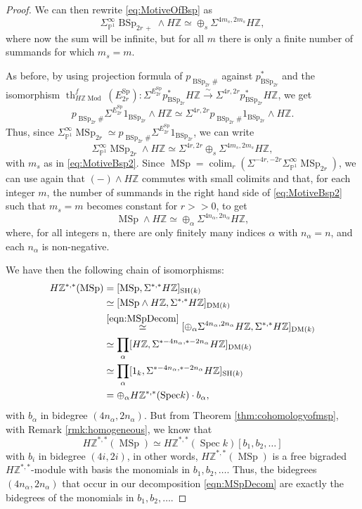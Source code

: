\documentclass[10pt]{amsart}
\theoremstyle{definition}
\theoremstyle{plain}
\numberwithin{equation}{section}
\newcommand{\0}{\emptyset}
\renewcommand{\P}{{\mathbb P}}
\newcommand{\Z}{{\mathbb Z}}
\newcommand{\MSp}{{\operatorname{MSp}}}
\newcommand{\BSp}{{\operatorname{BSp}}}
\newcommand{\Sp}{{\operatorname{Sp}}}
\newcommand{\Spec}{{\operatorname{Spec}}}
\newcommand{\SH}{{\operatorname{SH}}}
\newcommand{\DM}{{\operatorname{DM}}}
\renewcommand{\th}{{\operatorname{th}}}
\newcommand{\Mod}{{\operatorname{Mod}}}
\newcommand{\colim}{{\operatorname*{colim}}}
\begin{document}
\begin{proof}
    We can then rewrite \eqref{eq:MotiveOfBsp} as
    \begin{equation}
    \label{eq:MotiveBsp2}
        \Sigma_{\P^1}^\infty \BSp_{2r \, +}\wedge H\Z \simeq \oplus_s \Sigma^{4m_s,2m_s}H\Z,
    \end{equation}
    where now the sum will be infinite, but for all $m$ there is only a finite number of summands for which $m_s=m$.

    As before, by using projection formula of $p_{\BSp_{2r}\#}$ against $p_{\BSp_{2r}}^*$ and the isomorphism $\th^f_{H\Z \Mod}(E_{2r}^\Sp):\Sigma^{E_{2r}^\Sp}p_{\BSp_{2r}}^*H\Z \xrightarrow{\sim}\Sigma^{4r,2r}p_{\BSp_{2r}}^*H\Z$, we get
    $$p_{\BSp_{2r}\#}\Sigma^{E_{2r}^\Sp}1_{\BSp_{2r}}\wedge H\Z \simeq \Sigma^{4r,2r}p_{\BSp_{2r}\#}1_{\BSp_{2r}}\wedge H\Z.$$
    Thus, since $\Sigma_{\P^1}^\infty \MSp_{2r}\simeq p_{\BSp_{2r}\#}\Sigma^{E_{2r}^\Sp}1_{\BSp_{2r}}$, we can write
    $$\Sigma_{\P^1}^\infty \MSp_{2r} \wedge H\Z \simeq \Sigma^{4r,2r}\oplus_s \Sigma^{4m_s,2m_s}H\Z,$$
    with $m_s$ as in \eqref{eq:MotiveBsp2}. Since $\MSp =\colim_r(\Sigma^{-4r,-2r}\Sigma^\infty_{\P^1}\MSp_{2r})$, we can use again that $(-)\wedge H\Z$ commutes with small colimits and that, for each integer $m$, the number of summands in the right hand side of \eqref{eq:MotiveBsp2} such that $m_s=m$ becomes constant for $r>>0$, to get
    \begin{equation}\label{eqn:MSpDecom}
  \MSp \wedge H\Z \simeq \oplus_\alpha \Sigma^{4n_\alpha,2n_\alpha}H\Z,
  \end{equation}
    where, for all integers n, there are only finitely many indices $\alpha$ with $n_\alpha=n$, and each $n_\alpha$ is non-negative.

    We have then the following chain of isomorphisms:
  \begin{align*}H\Z^{*,*}(\MSp)&= [\MSp, \Sigma^{*,*}H\Z]_{\SH(k)}\\
        &\simeq [\MSp \wedge H\Z, \Sigma^{*,*}H\Z]_{\DM(k)}\\
        &\overset{\eqref{eqn:MSpDecom}}{\simeq} [\oplus_\alpha \Sigma^{4n_\alpha,2n_\alpha}H\Z,\Sigma^{*,*}H\Z]_{\DM(k)} \\
       & \simeq \prod_\alpha[H\Z,\Sigma^{*-4n_\alpha,*-2n_\alpha}H\Z]_{\DM(k)}\\
       & \simeq \prod_\alpha[1_k,\Sigma^{*-4n_\alpha,*-2n_\alpha}H\Z]_{\SH(k)}\\
       &=\oplus_\alpha H\Z^{*,*}(\Spec k)\cdot b_\alpha,
   \end{align*}
with $b_\alpha$ in bidegree $(4n_\alpha,2n_\alpha)$. But from Theorem \ref{thm:cohomologyofmsp}, with Remark \ref{rmk:homogeneous}, we know that 
    $$H\Z^{*,*}(\MSp) \simeq H\Z^{*,*}(\Spec k)[b_1,b_2,\ldots]$$
    with $b_i$ in bidegree $(4i,2i)$, in other words, $H\Z^{*,*}(\MSp)$ is a free bigraded $H\Z^{*,*}$-module with basis the monomials in $b_1, b_2,\ldots$. Thus, the bidegrees $(4n_\alpha,2n_\alpha)$ that occur in our decomposition \eqref{eqn:MSpDecom} are exactly the bidegrees of the monomials in $b_1, b_2,\ldots$.
    

\end{proof}
\end{document}
